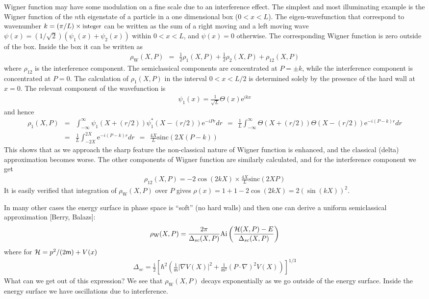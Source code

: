 \documentclass[onecolumn,fleqn, 11pt]{revtex4}
\newcommand{\sinc}{\mathrm{sinc}}
\newcommand{\eexp}{\mathrm{e}^}
\newcommand{\mass}{\mathsf{m}}
\newcommand{\tbox}[1]{\text{#1}}
\newcommand{\beq}{\begin{eqnarray}}
\newcommand{\eeq}{\end{eqnarray}}
\begin{document}
Wigner function may have some modulation on 
a fine scale due to an interference effect. 
The simplest and most illuminating example 
is the Wigner function of the $n$th eigenstate 
of a particle in a one dimensional box ($0<x<L$).
The eigen-wavefunction that correspond 
to wavenumber ${k=(\pi/L)\times \mbox{\small integer}}$ 
can be written as the sum of a right moving 
and a left moving wave 
${\psi(x)= (1/\sqrt{2})(\psi_1(x)+\psi_2(x))}$
within $0<x<L$, and $\psi(x)=0$ otherwise.
The corresponding Wigner function
is zero outside of the box. Inside the box
it can be written as
\beq
\rho_{\tbox{W}}(X,P) \ \ = \ \ 
\frac{1}{2}\rho_1(X,P)+\frac{1}{2}\rho_2(X,P)+\rho_{12}(X,P)
\eeq
where $\rho_{12}$ is the interference component.
The semiclassical components are concentrated
at $P=\pm k$, while the interference component
is concentrated at $P=0$.
The calculation of $\rho_1(X,P)$ in the interval $0<x<L/2$ 
is determined solely by the presence of the hard wall at $x=0$.
The relevant component of the wavefunction is
\beq
\psi_1(x) = \frac{1}{\sqrt{L}}\Theta(x) \eexp{ikx}
\eeq
and hence
\beq
\rho_1(X,P) &=&
\int_{-\infty}^{\infty}
\psi_1(X+(r/2))\psi_1^*(X-(r/2)) \eexp{-iPr} dr
\ \ = \ \ 
\frac{1}{L}
\int_{-\infty}^{\infty}
\Theta(X+(r/2))\Theta(X-(r/2))\eexp{-i(P-k)r} dr
\nonumber \\ \ &=&
\frac{1}{L}
\int_{-2X}^{2X}\eexp{-i(P-k)r} dr
\ \ = \ \ 
\frac{4X}{L} \sinc(2X(P-k))
\eeq
This shows that as we approach the sharp feature
the non-classical nature of Wigner function
is enhanced, and the classical (delta) approximation
becomes worse. The other components of Wigner function
are similarly calculated,
and for the interference component we get
\beq
\rho_{12}(X,P) =-2\cos(2kX) \times \frac{4X}{L} \sinc(2XP)
\eeq
It is easily verified that integration of $\rho_{\tbox{W}}(X,P)$
over $P$ gives $\rho(x)=1+1-2\cos(2kX) = 2(\sin(kX))^2$.



In many other cases the energy surface in phase space 
is ``soft'' (no hard walls) and then one can derive a 
uniform semiclassical approximation [Berry, Balazs]:  
\beq
\rho_{\tbox{W}}(X,P) = \frac{2\pi}{\Delta_{sc}(X,P)}\mathrm{Ai}
\left(\frac{{\cal H}(X,P)-E}{\Delta_{sc}(X,P)}\right)
\eeq
where for ${\cal H}=p^2/(2\mass)+V(x)$ 
\beq
\Delta_{sc} = \frac{1}{2}\left[
\hbar^2 \left(\frac{1}{\mass}|\nabla V(X)|^2
+\frac{1}{\mass^2} (P\cdot \nabla)^2 V(X)\right)
\right]^{1/3}
\eeq
What can we get out of this expression? 
We see that $\rho_{\tbox{W}}(X,P)$ decays 
exponentially as we go outside of the 
energy surface. Inside the energy surface 
we have oscillations due to interference.
 
\end{document}
